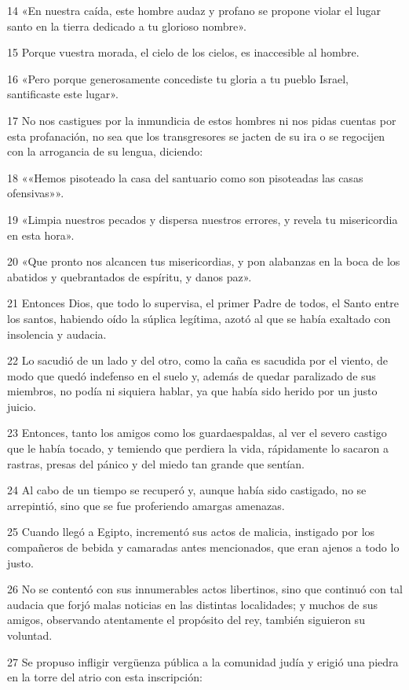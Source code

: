 \par 14 «En nuestra caída, este hombre audaz y profano se propone violar el lugar santo en la tierra dedicado a tu glorioso nombre».
\par 15 Porque vuestra morada, el cielo de los cielos, es inaccesible al hombre.
\par 16 «Pero porque generosamente concediste tu gloria a tu pueblo Israel, santificaste este lugar».
\par 17 No nos castigues por la inmundicia de estos hombres ni nos pidas cuentas por esta profanación, no sea que los transgresores se jacten de su ira o se regocijen con la arrogancia de su lengua, diciendo:
\par 18 ««Hemos pisoteado la casa del santuario como son pisoteadas las casas ofensivas»».
\par 19 «Limpia nuestros pecados y dispersa nuestros errores, y revela tu misericordia en esta hora».
\par 20 «Que pronto nos alcancen tus misericordias, y pon alabanzas en la boca de los abatidos y quebrantados de espíritu, y danos paz».
\par 21 Entonces Dios, que todo lo supervisa, el primer Padre de todos, el Santo entre los santos, habiendo oído la súplica legítima, azotó al que se había exaltado con insolencia y audacia.
\par 22 Lo sacudió de un lado y del otro, como la caña es sacudida por el viento, de modo que quedó indefenso en el suelo y, además de quedar paralizado de sus miembros, no podía ni siquiera hablar, ya que había sido herido por un justo juicio.
\par 23 Entonces, tanto los amigos como los guardaespaldas, al ver el severo castigo que le había tocado, y temiendo que perdiera la vida, rápidamente lo sacaron a rastras, presas del pánico y del miedo tan grande que sentían.
\par 24 Al cabo de un tiempo se recuperó y, aunque había sido castigado, no se arrepintió, sino que se fue proferiendo amargas amenazas.
\par 25 Cuando llegó a Egipto, incrementó sus actos de malicia, instigado por los compañeros de bebida y camaradas antes mencionados, que eran ajenos a todo lo justo.
\par 26 No se contentó con sus innumerables actos libertinos, sino que continuó con tal audacia que forjó malas noticias en las distintas localidades; y muchos de sus amigos, observando atentamente el propósito del rey, también siguieron su voluntad.
\par 27 Se propuso infligir vergüenza pública a la comunidad judía y erigió una piedra en la torre del atrio con esta inscripción:
